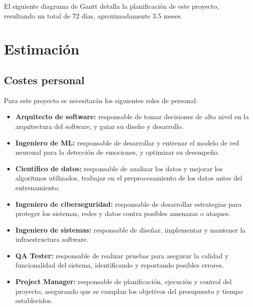 \documentclass[12pt]{report} %
\begin{document}
El siguiente diagrama de Gantt detalla la planificación de este proyecto, resultando un total de 72 días, aproximadamente 3.5 meses. 



\section{Estimación}

\subsection{Costes personal}

Para este proyecto se necesitarán los siguientes roles de personal:

\begin{itemize}

    \item \textbf{Arquitecto de software:} responsable de tomar decisiones de alto nivel en la arquitectura del software, y guiar su diseño y desarrollo.
    \item \textbf{Ingeniero de ML:} responsable de desarrollar y entrenar el modelo de red neuronal para la detección de emociones, y optimizar su desempeño.
    \item \textbf{Científico de datos:} responsable de analizar los datos y mejorar los algoritmos utilizados, trabajar en el preprocesamiento de los datos antes del entrenamiento.
	\item \textbf{Ingeniero de ciberseguridad:} responsable de desarrollar estrategias para proteger los sistemas, redes y datos contra posibles amenazas o ataques.
	\item \textbf{Ingeniero de sistemas:} responsable de diseñar, implementar y mantener la infraestructura software.
    \item \textbf{QA Tester:} responsable de realizar pruebas para asegurar la calidad y funcionalidad del sistema, identificando y reportando posibles errores.
    \item \textbf{Project Manager:} responsable de planificación, ejecución y control del proyecto, asegurando que se cumplan los objetivos del presupuesto y tiempo establecidos.

\end{itemize}
\end{document}
